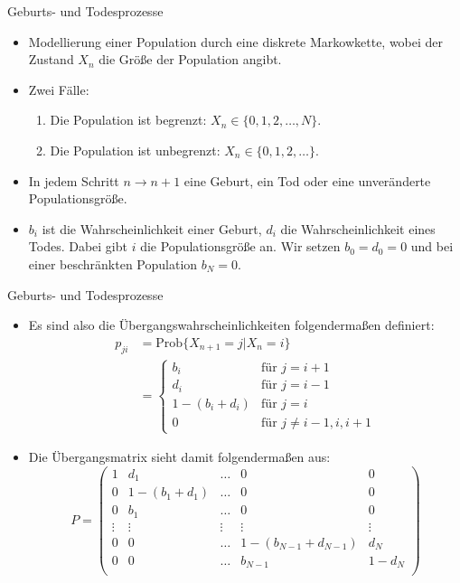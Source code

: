 \documentclass{beamer}
\begin{document}
\begin{frame}{Geburts- und Todesprozesse}
  \begin{itemize}
  \item Modellierung einer Population durch eine diskrete Markowkette, wobei der Zustand $X_n$ die Größe der Population angibt.
  \item Zwei Fälle:
    \begin{enumerate}
    \item Die Population ist begrenzt: $X_n \in \{0,1,2,\dots,N\}$.
    \item Die Population ist unbegrenzt: $X_n \in \{0,1,2,\dots\}$.
    \end{enumerate}
  \item In jedem Schritt $n → n+1$ eine Geburt, ein Tod oder eine unveränderte Populationsgröße.
  \item $b_i$ ist die Wahrscheinlichkeit einer Geburt, $d_i$ die Wahrscheinlichkeit eines Todes. Dabei gibt $i$ die Populationsgröße an. Wir setzen $b_0 = d_0 = 0$ und bei einer beschränkten Population $b_N = 0$.
  \end{itemize}
\end{frame}
\begin{frame}{Geburts- und Todesprozesse}
  \begin{itemize}
  \item Es sind also die Übergangswahrscheinlichkeiten folgendermaßen definiert:
    \begin{align*}
  p_{ji} &= \text{Prob}\{X_{n+1} = j | X_n = i\} \\
         &= \begin{cases}
           b_i &\text{für } j = i+1 \\
           d_i &\text{für } j = i-1 \\
           1 - (b_i+d_i) &\text{für } j = i \\
           0 &\text{für } j \neq i-1,i,i+1
         \end{cases}
    \end{align*}
  \item  Die Übergangsmatrix sieht damit folgendermaßen aus:
    \[
      P = \begin{pmatrix}
        1 & d_1 & \dots & 0 & 0 \\
        0 & 1 - (b_1 + d_1) &  \dots & 0 & 0 \\
        0 & b_1 & \dots & 0 & 0 \\
        \vdots & \vdots & \vdots & \vdots & \vdots \\
        0 & 0  &  \dots & 1 - (b_{N-1} + d_{N-1}) & d_N \\
        0 & 0  &  \dots & b_{N-1} & 1 - d_N \\
      \end{pmatrix}
    \]
  \end{itemize}
\end{frame}
\end{document}
